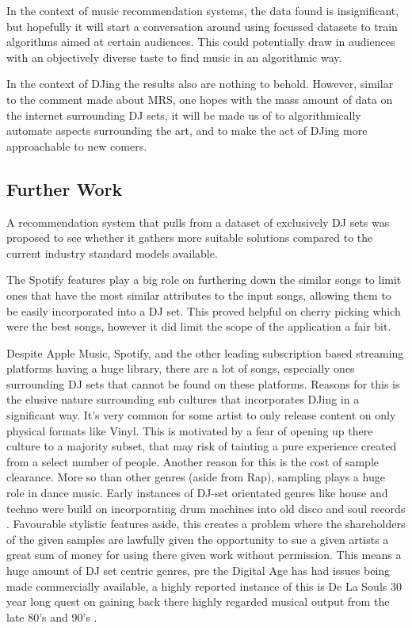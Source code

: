 In the context of music recommendation systems, the data found is insignificant, but hopefully it will start a conversation around using focussed datasets to train algorithms aimed at certain audiences. This could potentially draw in audiences with an objectively diverse taste to find music in an algorithmic way.

In the context of DJing the results also are nothing to behold. However, similar to the comment made about MRS, one hopes with the mass amount of data on the internet surrounding DJ sets, it will be made us of to algorithmically automate aspects surrounding the art, and to make the act of DJing more approachable to new comers. 

\subsection{Further Work}

A recommendation system that pulls from a dataset of exclusively DJ sets was proposed to see whether it gathers more suitable solutions compared to the current industry standard models available. 

The Spotify features play a big role on furthering down the similar songs to limit ones that have the most similar attributes to the input songs, allowing them to be easily incorporated into a DJ set. This proved helpful on cherry picking which were the best songs, however it did limit the scope of the application a fair bit. 

Despite Apple Music, Spotify, and the other leading subscription based streaming platforms having a huge library, there are a lot of songs, especially ones surrounding DJ sets that cannot be found on these platforms. Reasons for this is the elusive nature surrounding sub cultures that incorporates DJing in a significant way. It's very common for some artist to only release content on only physical formats like Vinyl. This is motivated by a fear of opening up there culture to a majority subset, that may risk of tainting a pure experience created from a select number of people. Another reason for this is the cost of sample clearance. More so than other genres (aside from Rap), sampling plays a huge role in dance music. Early instances of DJ-set orientated genres like house and techno were build on incorporating drum machines into old disco and soul records \citep{reynolds_energy_2013}. Favourable stylistic features aside, this creates a problem where the shareholders of the given samples are lawfully given the opportunity to sue a given artists a great sum of money for using there given work without permission. This means a huge amount of DJ set centric genres, pre the Digital Age has had issues being made commercially available, a highly reported instance of this is De La Souls 30 year long quest on gaining back there highly regarded musical output from the late 80's and 90's \citep{saunders_soul_2023}.


